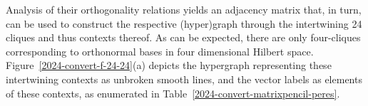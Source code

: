\documentclass[
  twocolumn,
 showpacs,
 showkeys,
 preprintnumbers,
 amsmath,amssymb,
 aps,
 prl,
  longbibliography,
 floatfix,
 ]{revtex4-2}
\begin{document}

Analysis of their orthogonality relations yields an adjacency matrix that, in turn,
can be used to construct the respective  (hyper)graph through the intertwining 24 cliques and thus contexts thereof.
As can be expected, there are only four-cliques corresponding to orthonormal bases in four dimensional Hilbert space.
Figure~\ref{2024-convert-f-24-24}(a) depicts the hypergraph representing these intertwining contexts as unbroken smooth lines,
 and the vector labels as elements of these contexts,
as enumerated in Table~\ref{2024-convert-matrixpencil-peres}.
\end{document}
